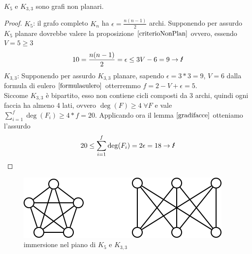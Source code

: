 \begin{lemma}\label{k5k33nonplanari}
    \(K_5\) e \(K_{3,3}\) sono grafi non planari.
    \begin{proof}
        \underline{\(K_5\)}: il grafo completo \(K_n\) ha \(\epsilon=\frac{n(n-1)}{2}\) archi. Supponendo per assurdo \(K_5\) planare dovrebbe valere la proposizione \(\ref{criterioNonPlan}\) ovvero, essendo \(V=5 \geq 3\)
        \begin{equation}
            10 = \frac{n(n-1)}{2} = \epsilon \leq 3V-6 = 9 \rightarrow \text{\Lightning}
        \end{equation}
        \underline{\(K_{3,3}\)}: Supponendo per assurdo \(K_{3,3}\) planare, sapendo \(\epsilon=3*3=9\), \(V=6\) dalla formula di eulero \(\ref{formulaeulero}\) otterremmo \(f=2-V+\epsilon=5\). \\
        Siccome \(K_{3,3}\) è bipartito, esso non contiene cicli composti da 3 archi, quindi ogni faccia ha almeno 4 lati, ovvero \(\deg(F)\geq 4 \;\forall F\) e vale \(\sum_{i=1}^{f} \deg(F_i) \geq 4*f = 20\). Applicando ora il lemma \(\ref{gradifacce}\) otteniamo l'assurdo
        \begin{equation}
            20 \leq \sum_{i=1}^{f} \deg(F_i) = 2\epsilon = 18 \rightarrow\text{\Lightning}
        \end{equation} 
    \end{proof}
    \begin{figure}[H]
        \centering
        \includegraphics[scale=0.6]{img/k533.PNG}
        \caption{immersione nel piano di \(K_5\) e \(K_{3,3}\)}
    \end{figure} 
\end{lemma}


